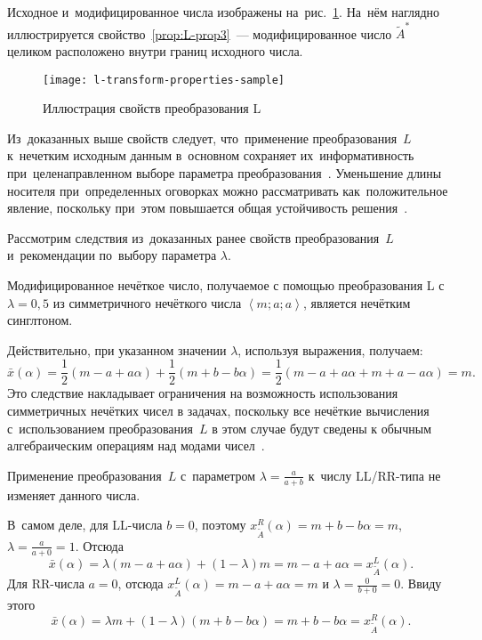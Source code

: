 Исходное и~модифицированное числа изображены на~рис.~\ref{fig:l-transform-properties-sample}. На~нём наглядно иллюстрируется свойство~\ref{prop:L-prop3}~--- модифицированное число $\tilde A^{*}$ целиком расположено внутри границ исходного числа.
\begin{figure}[h!]
  \centering
  {
    \texttt{[image: l-transform-properties-sample]}
    \caption{Иллюстрация свойств преобразования L}
    \label{fig:l-transform-properties-sample}
  }
\end{figure}

Из~доказанных выше свойств следует, что~применение преобразования~$L$ к~нечетким исходным данным в~основном сохраняет их~информативность при~целенаправленном выборе параметра преобразования~\cite{VSU-1}. Уменьшение длины носителя при~определенных оговорках можно рассматривать как~положительное явление, поскольку при~этом повышается общая устойчивость решения~\cite{Vorontsov_PI}.

Рассмотрим следствия из~доказанных ранее свойств преобразования~$L$ и~рекомендации по~выбору параметра $\lambda$.
\begin{cor}
Модифицированное нечёткое число, получаемое с помощью преобразования L с~$\lambda =0,5$ из симметричного нечёткого числа $\left\langle m;a;a \right\rangle$, является нечётким синглтоном.
\end{cor}
Действительно, при указанном значении $\lambda $, используя выражения, получаем:
\begin{equation*}
  \bar{x}\left( \alpha  \right)=\frac{1}{2}\left( m-a+a\alpha  \right)+\frac{1}{2}\left( m+b-b\alpha  \right)=\frac{1}{2}\left( m-a+a\alpha +m+a-a\alpha  \right)=m.
\end{equation*}
Это следствие накладывает ограничения на возможность использования симметричных нечётких чисел в задачах, поскольку все нечёткие вычисления с~использованием преобразования~$L$ в этом случае будут сведены к обычным алгебраическим операциям над модами чисел~\cite{Alushta-1, VSU-1}.

\begin{cor}
Применение преобразования~$L$ с~параметром $\displaystyle \lambda =\frac{a}{a+b}$ к~числу LL/RR-типа не изменяет данного числа.
\end{cor}
В~самом деле, для LL-числа $b=0$, поэтому $x_{{\tilde{A}}}^{R}\left( \alpha  \right)=m+b-b\alpha=m$, $\lambda=\frac{a}{a+0}=1$. Отсюда
\begin{equation*}
  \bar{x}\left( \alpha  \right)=\lambda \left( m-a+a\alpha  \right)+\left( 1-\lambda  \right)m=m-a+a\alpha =x_{\tilde A}^{L}\left( \alpha  \right).
\end{equation*}
Для RR-числа $a=0$, отсюда $x_{\tilde A}^{L}\left( \alpha  \right)=m-a+a\alpha=m$ и $\lambda =\frac{0}{b+0}=0$. Ввиду этого
\begin{equation*}
  \bar{x}\left( \alpha  \right)=\lambda m+\left( 1-\lambda  \right)\left( m+b-b\alpha  \right)=m+b-b\alpha =x_{\tilde A}^{R}\left( \alpha  \right).
\end{equation*}

